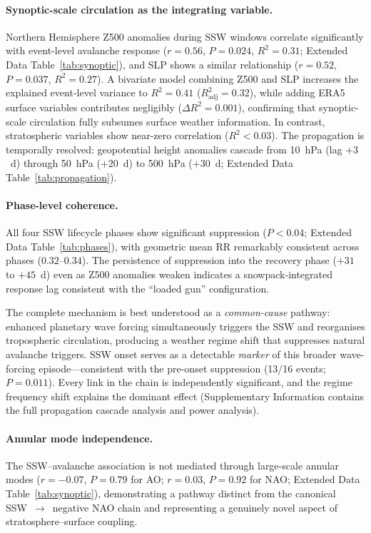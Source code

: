 \documentclass[11pt,letterpaper]{article}
\begin{document}
\paragraph{Synoptic-scale circulation as the integrating variable.} Northern Hemisphere Z500 anomalies during SSW windows correlate significantly with event-level avalanche response ($r = 0.56$, $P = 0.024$, $R^2 = 0.31$; Extended Data Table~\ref{tab:synoptic}), and SLP shows a similar relationship ($r = 0.52$, $P = 0.037$, $R^2 = 0.27$). A bivariate model combining Z500 and SLP increases the explained event-level variance to $R^2 = 0.41$ ($R^2_{\mathrm{adj}} = 0.32$), while adding ERA5 surface variables contributes negligibly ($\Delta R^2 = 0.001$), confirming that synoptic-scale circulation fully subsumes surface weather information. In contrast, stratospheric variables show near-zero correlation ($R^2 < 0.03$). The propagation is temporally resolved: geopotential height anomalies cascade from 10~hPa (lag $+3$~d) through 50~hPa ($+20$~d) to 500~hPa ($+30$~d; Extended Data Table~\ref{tab:propagation}).

\paragraph{Phase-level coherence.} All four SSW lifecycle phases show significant suppression ($P < 0.04$; Extended Data Table~\ref{tab:phases}), with geometric mean RR remarkably consistent across phases ($0.32$--$0.34$). The persistence of suppression into the recovery phase ($+31$ to $+45$~d) even as Z500 anomalies weaken indicates a snowpack-integrated response lag consistent with the ``loaded gun'' configuration.

The complete mechanism is best understood as a \emph{common-cause} pathway: enhanced planetary wave forcing simultaneously triggers the SSW and reorganises tropospheric circulation, producing a weather regime shift that suppresses natural avalanche triggers. SSW onset serves as a detectable \emph{marker} of this broader wave-forcing episode---consistent with the pre-onset suppression (13/16 events; $P = 0.011$). Every link in the chain is independently significant, and the regime frequency shift explains the dominant effect (Supplementary Information contains the full propagation cascade analysis and power analysis).

\paragraph{Annular mode independence.} The SSW--avalanche association is not mediated through large-scale annular modes ($r = -0.07$, $P = 0.79$ for AO; $r = 0.03$, $P = 0.92$ for NAO; Extended Data Table~\ref{tab:synoptic}), demonstrating a pathway distinct from the canonical SSW~$\to$~negative NAO chain\cite{Baldwin2001,Kidston2015} and representing a genuinely novel aspect of stratosphere--surface coupling.
\end{document}
